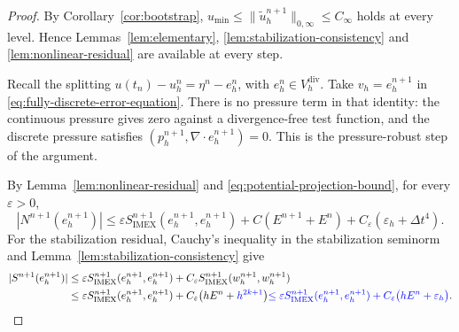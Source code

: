 \documentclass[11pt]{article}
\theoremstyle{remark}\newtheorem{remark}{Remark}
\newcommand{\Vdivh}{V_h^{\mathrm{div}}}
\newcommand{\tu}{\tilde u_h}
\newcommand{\Simex}{S_{\mathrm{IMEX}}}
\newcommand{\eps}{\varepsilon}
\theoremstyle{plain}
\newcommand{\new}[1]{{\color{blue}#1}}
\begin{document}
\begin{proof}
\new{By Corollary~\ref{cor:bootstrap}, $u_{\min}\le\|\tu^{n+1}\|_{0,\infty}\le C_\infty$ holds at every level.} Hence Lemmas~\ref{lem:elementary}, \ref{lem:stabilization-consistency} and \ref{lem:nonlinear-residual} are available at every step.

Recall the splitting $u(t_n)-u_h^n=\eta^n-e_h^n$, with $e_h^n\in\Vdivh$. Take $v_h=e_h^{n+1}$ in \eqref{eq:fully-discrete-error-equation}. There is no pressure term in that identity: the continuous pressure gives zero against a divergence-free test function, and the discrete pressure satisfies $(p_h^{n+1},\nabla\cdot e_h^{n+1})=0$. This is the pressure-robust step of the argument.

By Lemma~\ref{lem:nonlinear-residual} and \eqref{eq:potential-projection-bound}, for every $\eps>0$,
\begin{equation}\label{eq:nonlinear-bound-in-energy-proof}
|N^{n+1}(e_h^{n+1})|
\le\eps\Simex^{n+1}(e_h^{n+1},e_h^{n+1})
+C(E^{n+1}+E^n)+C_\eps(\varepsilon_h+\Delta t^4).
\end{equation}
For the stabilization residual, Cauchy's inequality in the stabilization seminorm and Lemma~\ref{lem:stabilization-consistency} give
\begin{equation}\label{eq:stabilization-consistency-bound}
\begin{aligned}
|S^{n+1}(e_h^{n+1})|
&\le\eps\Simex^{n+1}(e_h^{n+1},e_h^{n+1})
+C_\eps\Simex^{n+1}(w_h^{n+1},w_h^{n+1})\\
&\le\eps\Simex^{n+1}(e_h^{n+1},e_h^{n+1})
+C_\eps\big(hE^n+\new{h^{2k+1}}\big)\new{\le\eps\Simex^{n+1}(e_h^{n+1},e_h^{n+1})+C_\eps\big(hE^n+\varepsilon_h\big)}.
\end{aligned}
\end{equation}


\end{proof}
\end{document}
